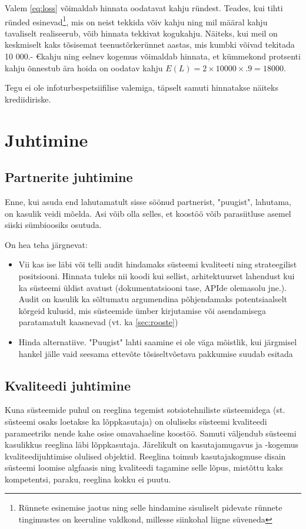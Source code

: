 \documentclass{article}
\begin{document}
Valem \ref{eq:loss} võimaldab hinnata oodatavat kahju ründest. Teades, kui tihti ründed esinevad\footnote{Rünnete esinemise jaotus ning selle hindamine sisuliselt pidevate rünnete tingimustes on keeruline valdkond, millesse siinkohal liigne süveneda}, mis on neist tekkida võiv kahju ning mil määral kahju tavaliselt realiseerub, võib hinnata tekkivat kogukahju. Näiteks, kui meil on keskmiselt kaks tõsisemat teenustõrkerünnet aastas, mis kumbki võivad tekitada 10 000.- \euro kahju ning eelnev kogemus võimaldab hinnata, et kümmekond protsenti kahju õnnestub ära hoida on oodatav kahju $E(L)=2 \times 10000 \times .9 = 18 000$. 

Tegu ei ole infoturbespetsiifilise valemiga, täpselt samuti hinnatakse näiteks krediidiriske.

\section{Juhtimine}
\subsection{Partnerite juhtimine}
Enne, kui asuda end lahutamatult sisse söönud partnerist, "puugist", lahutama, on kasulik veidi mõelda. Asi võib olla selles, et koostöö võib parasiitluse asemel siiski sümbioosiks osutuda. 

On hea teha järgnevat:
\begin{itemize}
	\item Vii kas ise läbi või telli audit hindamaks süsteemi kvaliteeti ning strateegilist positsiooni. Hinnata tuleks nii koodi kui sellist, arhitektuurset lahendust kui ka süsteemi üldist avatust (dokumentatsiooni tase, APIde olemasolu jne.). Audit on kasulik ka sõltumatu argumendina põhjendamaks potentsiaalselt kõrgeid kulusid, mis süsteemide ümber kirjutamise või asendamisega paratamatult kaasnevad (vt. ka \ref{sec:rooste})
	\item Hinda alternatiive. "Puugist" lahti saamine ei ole väga mõistlik, kui järgmisel hankel jälle vaid seesama ettevõte tõsiseltvõetava pakkumise suudab esitada  
\end{itemize}

\subsection{Kvaliteedi juhtimine}
Kuna süsteemide puhul on reeglina tegemist sotsiotehniliste süsteemidega (st. süsteemi osaks loetakse ka lõppkasutaja) on oluliseks süsteemi kvaliteedi parameetriks nende kahe osise omavahaeline koostöö. Samuti väljendub süsteemi kasulikkus reeglina läbi lõppkasutaja. Järelikult on kasutajamugavus ja -kogemus kvaliteedijuhtimise olulised objektid. Reeglina toimub kasutajakogmuse disain süsteemi loomise algfaasis ning kvaliteedi tagamine selle lõpus, mistõttu kaks kompetentsi, paraku, reeglina kokku ei puutu.  
\end{document}
